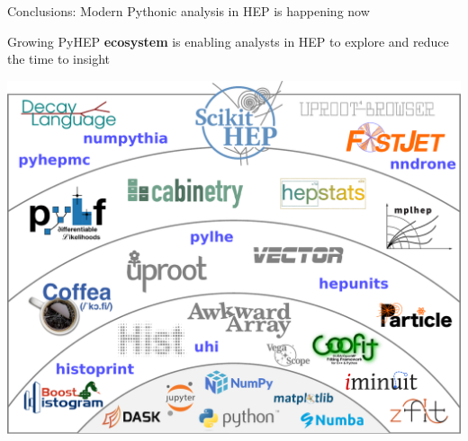 \documentclass[aspectratio=169]{beamer}
\begin{document}
\begin{frame}{Conclusions: Modern Pythonic analysis in HEP is happening now}
\Large
\begin{center}
Growing PyHEP \textbf{ecosystem} is enabling analysts in HEP to explore and reduce the time to insight
\end{center}
\vspace{0.1 cm}

\begin{center}
  \href{https://indico.cern.ch/event/1140031/}{\includegraphics[width=0.55\linewidth]{shells-hep.pdf}}
\end{center}
\end{frame}
\end{document}
